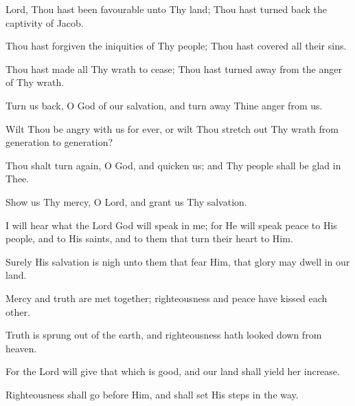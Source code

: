 Lord, Thou hast been favourable unto Thy land; Thou hast turned back the captivity of Jacob.

Thou hast forgiven the iniquities of Thy people; Thou hast covered all their sins.

Thou hast made all Thy wrath to cease; Thou hast turned away from the anger of Thy wrath.

Turn us back, O God of our salvation, and turn away Thine anger from us.

Wilt Thou be angry with us for ever, or wilt Thou stretch out Thy wrath from generation to generation?

Thou shalt turn again, O God, and quicken us; and Thy people shall be glad in Thee.

Show us Thy mercy, O Lord, and grant us Thy salvation.

I will hear what the Lord God will speak in me; for He will speak peace to His people, and to His saints, and to them that turn their heart to Him.

Surely His salvation is nigh unto them that fear Him, that glory may dwell in our land.

Mercy and truth are met together; righteousness and peace have kissed each other.

Truth is sprung out of the earth, and righteousness hath looked down from heaven.

For the Lord will give that which is good, and our land shall yield her increase.

Righteousness shall go before Him, and shall set His steps in the way.
